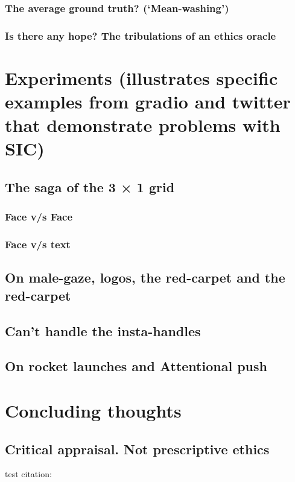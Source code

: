 \documentclass[letterpaper]{article} %
\begin{document}
\subsubsection{The average ground truth? (‘Mean-washing’)}
\subsubsection{Is there any hope? The tribulations of an ethics oracle}
\section{Experiments (illustrates specific examples from gradio and twitter that demonstrate problems with SIC)}
\subsection{The saga of the 3 × 1 grid}
\subsubsection{Face v/s Face}
\subsubsection{Face v/s text}
\subsection{On male-gaze, logos, the red-carpet and the red-carpet}
\subsection{Can’t handle the insta-handles}
\subsection{On rocket launches and Attentional push}  

\section{Concluding thoughts}

\subsection{Critical appraisal. Not prescriptive ethics}


test citation: \cite{arditi2019digital_twitter_radical}


\end{document}
